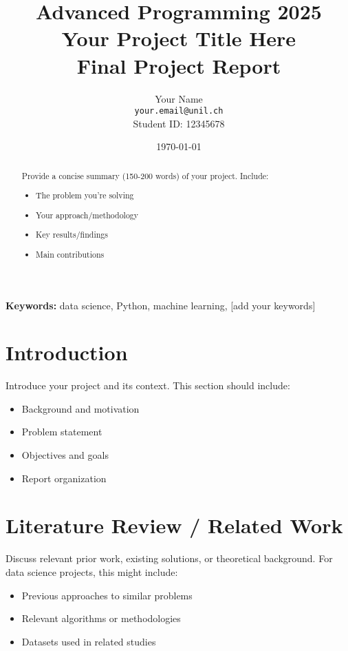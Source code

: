 \documentclass[11pt,a4paper]{article}
\title{%
    \Large \textbf{Advanced Programming 2025} \\
    \vspace{0.5cm}
    \LARGE \textbf{Your Project Title Here} \\
    \vspace{0.3cm}
    \large Final Project Report
}
\author{
    Your Name \\
    \texttt{your.email@unil.ch} \\
    Student ID: 12345678
}
\date{\today}
\begin{document}
\maketitle
\thispagestyle{empty}

\begin{abstract}
\noindent
Provide a concise summary (150-200 words) of your project. Include:
\begin{itemize}
    \item The problem you're solving
    \item Your approach/methodology
    \item Key results/findings
    \item Main contributions
\end{itemize}
\end{abstract}

\vspace{0.5cm}
\noindent\textbf{Keywords:} data science, Python, machine learning, [add your keywords]

\newpage
\tableofcontents
\newpage


\section{Introduction}
\label{sec:introduction}

Introduce your project and its context. This section should include:
\begin{itemize}
    \item Background and motivation
    \item Problem statement
    \item Objectives and goals
    \item Report organization
\end{itemize}

\section{Literature Review / Related Work}
\label{sec:literature}

Discuss relevant prior work, existing solutions, or theoretical background. For data science projects, this might include:
\begin{itemize}
    \item Previous approaches to similar problems
    \item Relevant algorithms or methodologies
    \item Datasets used in related studies
\end{itemize}
\end{document}
